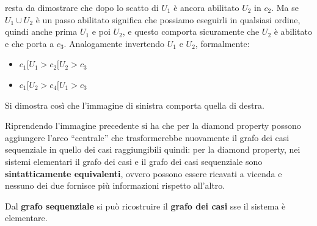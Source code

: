 \begin{esempio}
\begin{enumerate}
  resta da dimostrare che dopo lo scatto di $U_1$ è ancora abilitato $U_2$ in
  $c_2$. Ma se $U_1\cup U_2$ è un passo abilitato significa che possiamo eseguirli
  in qualsiasi ordine, quindi anche prima $U_1$ e poi $U_2$, e questo comporta
  sicuramente che $U_2$ è abilitato e che porta a $c_3$. Analogamente invertendo
  $U_1$ e $U_2$, formalmente: 
  \begin{itemize}
    \item $c_1[U_1>c_2[U_2>c_3$
    \item $c_1[U_2>c_4[U_1>c_3$
  \end{itemize}
  Si dimostra così che l'immagine di sinistra comporta quella di destra.
\end{enumerate}
\end{esempio}
\begin{nota}
Riprendendo l'immagine precedente si ha che per la diamond property possono
aggiungere l'arco ``centrale'' che trasformerebbe nuovamente il grafo dei casi
sequenziale in quello dei casi raggiungibili quindi:
per la diamond property, nei sistemi elementari il grafo dei casi e il
  grafo dei casi sequenziale sono \textbf{sintatticamente equivalenti}, ovvero
  possono essere ricavati a vicenda e nessuno dei due fornisce più informazioni rispetto all'altro.
\end{nota}
  \begin{definizione}
    Dal \textbf{grafo sequenziale} si può ricostruire il \textbf{grafo dei casi} sse il sistema è elementare.
  \end{definizione} \vspace{5mm} %

